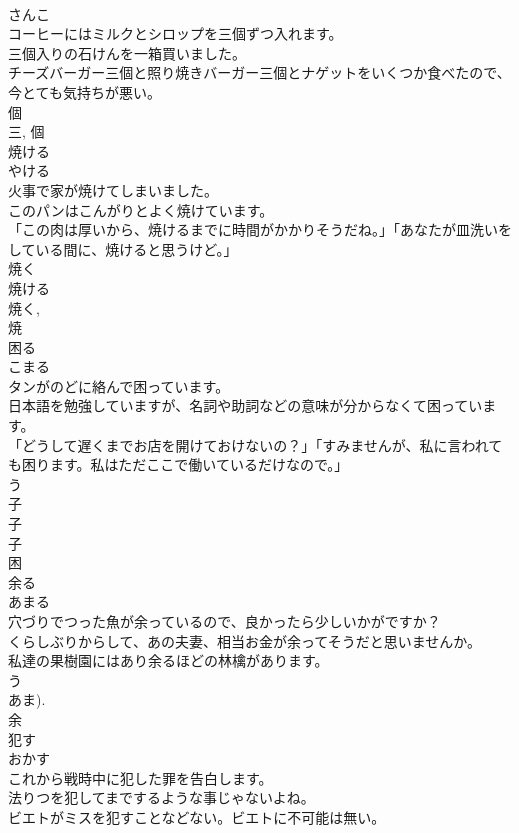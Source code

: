 \documentclass[8pt]{extreport}
\begin{document}
\begin{CJK}{UTF8}{min}
\\	さんこ	
\\	コーヒーにはミルクとシロップを三個ずつ入れます。	
\\	三個入りの石けんを一箱買いました。	
\\	チーズバーガー三個と照り焼きバーガー三個とナゲットをいくつか食べたので、今とても気持ちが悪い。	
\\	個 
\\	三, 個	
\\	焼ける	
\\	やける	
\\	火事で家が焼けてしまいました。	
\\	このパンはこんがりとよく焼けています。	
\\	「この肉は厚いから、焼けるまでに時間がかかりそうだね。」「あなたが皿洗いをしている間に、焼けると思うけど。」	
\\	焼く 
\\	焼ける 
\\	焼く, 
\\	焼	
\\	困る	
\\	こまる	
\\	タンがのどに絡んで困っています。	
\\	日本語を勉強していますが、名詞や助詞などの意味が分からなくて困っています。	
\\	「どうして遅くまでお店を開けておけないの？」「すみませんが、私に言われても困ります。私はただここで働いているだけなので。」	
\\	う 
\\	子
\\	子
\\	子
\\	困	
\\	余る	
\\	あまる	
\\	穴づりでつった魚が余っているので、良かったら少しいかがですか？	
\\	くらしぶりからして、あの夫妻、相当お金が余ってそうだと思いませんか。	
\\	私達の果樹園にはあり余るほどの林檎があります。	
\\	う 
\\	あま).
\\	余	
\\	犯す	
\\	おかす	
\\	これから戦時中に犯した罪を告白します。	
\\	法りつを犯してまでするような事じゃないよね。	
\\	ビエトがミスを犯すことなどない。ビエトに不可能は無い。	

\end{CJK}
\end{document}
